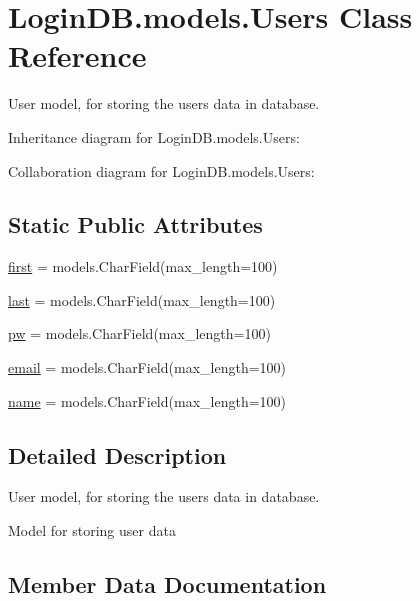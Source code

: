 \hypertarget{class_login_d_b_1_1models_1_1_users}{}\section{Login\+D\+B.\+models.\+Users Class Reference}
\label{class_login_d_b_1_1models_1_1_users}


User model, for storing the user\textquotesingle{}s data in database.  




Inheritance diagram for Login\+D\+B.\+models.\+Users\+:


Collaboration diagram for Login\+D\+B.\+models.\+Users\+:
\subsection*{Static Public Attributes}
\begin{DoxyCompactItemize}
\item 
\hyperlink{class_login_d_b_1_1models_1_1_users_a0f8656c5a15097214c9dc64e7899d3ff}{first} = models.\+Char\+Field(max\+\_\+length=100)
\item 
\hyperlink{class_login_d_b_1_1models_1_1_users_a494cd7971ac0f7b84ba3b6fbaef3385d}{last} = models.\+Char\+Field(max\+\_\+length=100)
\item 
\hyperlink{class_login_d_b_1_1models_1_1_users_a0d4f3382681e0cd5d8ebb744862d43eb}{pw} = models.\+Char\+Field(max\+\_\+length=100)
\item 
\hyperlink{class_login_d_b_1_1models_1_1_users_ab77e731c66867f7c24e8dce40ef3fe48}{email} = models.\+Char\+Field(max\+\_\+length=100)
\item 
\hyperlink{class_login_d_b_1_1models_1_1_users_adad00159dd32212404528798c281cb4b}{name} = models.\+Char\+Field(max\+\_\+length=100)
\end{DoxyCompactItemize}


\subsection{Detailed Description}
User model, for storing the user\textquotesingle{}s data in database. 

\begin{DoxyVerb}Model for storing user data
\end{DoxyVerb}
 

\subsection{Member Data Documentation}
\mbox{\label{class_login_d_b_1_1models_1_1_users_ab77e731c66867f7c24e8dce40ef3fe48}} 
